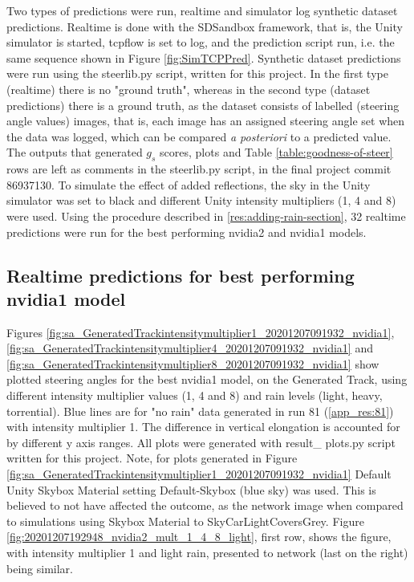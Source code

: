 Two types of predictions were run, realtime and simulator log synthetic dataset predictions. Realtime is done with the SDSandbox framework, that is, the Unity simulator is started, tcpflow is set to log, and the prediction script run, i.e. the same sequence shown in Figure \ref{fig:SimTCPPred}. Synthetic dataset predictions were run using the steerlib.py script, written for this project. 
In the first type (realtime) there is no "ground truth", whereas in the second type (dataset predictions) there is a ground truth, as the dataset consists of labelled (steering angle values) images, that is, each image has an assigned steering angle set when the data was logged, which can be compared \textit{a posteriori} to a predicted value.
The outputs that generated $g_s$ scores, plots and Table \ref{table:goodness-of-steer} rows are left as comments in the steerlib.py script, in the final project commit 86937130. To simulate the effect of added reflections, the sky in the Unity simulator was set to black and different Unity intensity multipliers (1, 4 and 8) were used.  
Using the procedure described in \ref{res:adding-rain-section}, 32 realtime predictions were run for the best performing nvidia2 and nvidia1 models.


\subsection{Realtime predictions for best performing nvidia1 model}
 Figures
\ref{fig:sa_GeneratedTrackintensitymultiplier1_20201207091932_nvidia1}, \ref{fig:sa_GeneratedTrackintensitymultiplier4_20201207091932_nvidia1} and
\ref{fig:sa_GeneratedTrackintensitymultiplier8_20201207091932_nvidia1} show plotted steering angles for the best nvidia1 model, on the Generated Track, using different intensity multiplier values (1, 4 and 8) and rain levels (light, heavy, torrential). Blue lines are for "no rain" data generated in run 81 (\ref{app_res:81}) with intensity multiplier 1. The difference in vertical elongation is accounted for by different y axis ranges. All plots were generated with result\_ plots.py script written for this project. Note, for plots generated in Figure \ref{fig:sa_GeneratedTrackintensitymultiplier1_20201207091932_nvidia1}
Default Unity Skybox Material setting Default-Skybox (blue sky) was used. This is believed to not have affected the outcome, as the network image when compared to simulations using Skybox Material to SkyCarLightCoversGrey. Figure \ref{fig:20201207192948_nvidia2_mult_1_4_8_light}, first row,
shows the figure, with intensity multiplier 1 and light rain, presented to network (last on the right) being similar.

